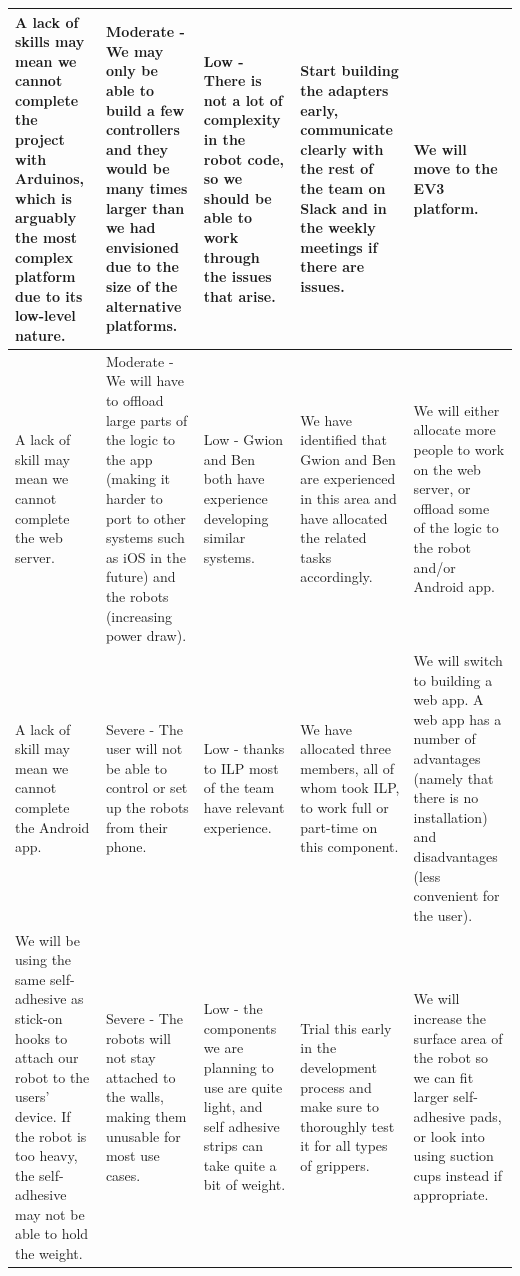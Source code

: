 \documentclass[onecolumn]{IEEEtran}
\begin{document}
\begin{center}
\begin{tabularx}{1.0\linewidth}{|L|L|L|L|L|}
        \hline
        A lack of skills may mean we cannot complete the project with Arduinos, which is arguably the most complex platform due to its low-level nature. & Moderate - We may only be able to build a few controllers and they would be many times larger than we had envisioned due to the size of the alternative platforms. & Low - There is not a lot of complexity in the robot code, so we should be able to work through the issues that arise. & Start building the adapters early, communicate clearly with the rest of the team on Slack and in the weekly meetings if there are issues. & We will move to the EV3 platform. \\
        \hline
        A lack of skill may mean we cannot complete the web server. & Moderate - We will have to offload large parts of the logic to the app (making it harder to port to other systems such as iOS in the future) and the robots (increasing power draw). & Low - Gwion and Ben both have experience developing similar systems. & We have identified that Gwion and Ben are experienced in this area and have allocated the related tasks accordingly. & We will either allocate more people to work on the web server, or offload some of the logic to the robot and/or Android app. \\
        \hline
        A lack of skill may mean we cannot complete the Android app. & Severe - The user will not be able to control or set up the robots from their phone. & Low - thanks to ILP most of the team have relevant experience. & We have allocated three members, all of whom took ILP, to work full or part-time on this component. & We will switch to building a web app. A web app has a number of advantages (namely that there is no installation) and disadvantages (less convenient for the user). \\
        \hline
        We will be using the same self-adhesive as stick-on hooks to attach our robot to the users' device. If the robot is too heavy, the self-adhesive may not be able to hold the weight. & Severe - The robots will not stay attached to the walls, making them unusable for most use cases. & Low - the components we are planning to use are quite light, and self adhesive strips can take quite a bit of weight. & Trial this early in the development process and make sure to thoroughly test it for all types of grippers. & We will increase the surface area of the robot so we can fit larger self-adhesive pads, or look into using suction cups instead if appropriate. \\
        \hline
    \end{tabularx}
\end{center}
\end{document}
